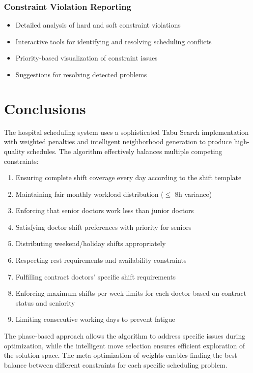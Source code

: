 \documentclass[12pt]{article}
\begin{document}
\subsubsection{Constraint Violation Reporting}
\begin{itemize}
    \item Detailed analysis of hard and soft constraint violations
    \item Interactive tools for identifying and resolving scheduling conflicts
    \item Priority-based visualization of constraint issues
    \item Suggestions for resolving detected problems
\end{itemize}

\section{Conclusions}

The hospital scheduling system uses a sophisticated Tabu Search implementation with weighted penalties and intelligent neighborhood generation to produce high-quality schedules. The algorithm effectively balances multiple competing constraints:

\begin{enumerate}
    \item Ensuring complete shift coverage every day according to the shift template
    \item Maintaining fair monthly workload distribution ($\leq$ 8h variance)
    \item Enforcing that senior doctors work less than junior doctors
    \item Satisfying doctor shift preferences with priority for seniors
    \item Distributing weekend/holiday shifts appropriately
    \item Respecting rest requirements and availability constraints
    \item Fulfilling contract doctors' specific shift requirements
    \item Enforcing maximum shifts per week limits for each doctor based on contract status and seniority
    \item Limiting consecutive working days to prevent fatigue
\end{enumerate}

The phase-based approach allows the algorithm to address specific issues during optimization, while the intelligent move selection ensures efficient exploration of the solution space. The meta-optimization of weights enables finding the best balance between different constraints for each specific scheduling problem.
\end{document}
